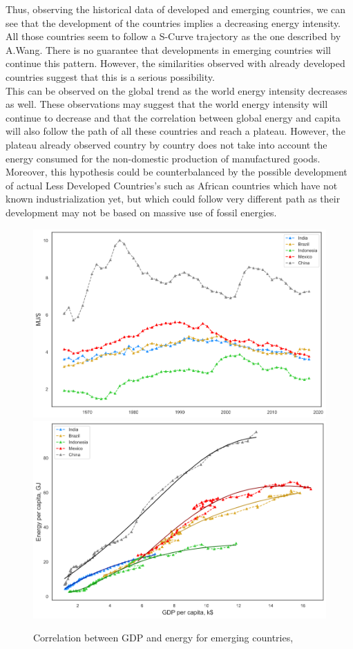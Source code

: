 \documentclass[conference]{IEEEtran}
\begin{document}
Thus, observing the historical data of developed and emerging countries, we can see that the development of the countries implies a decreasing energy intensity. All those countries seem to follow a S-Curve trajectory as the one described by A.Wang. There is no guarantee that developments in emerging countries will continue this pattern. However, the similarities observed with already developed countries suggest that this is a serious possibility. 
\\
This can be observed on the global trend as the world energy intensity decreases as well. These observations may suggest that the world energy intensity will continue to decrease and that the correlation between global energy and capita will also follow the path of all these countries and reach a plateau. However, the plateau already observed country by country does not take into account the energy consumed for the non-domestic production of manufactured goods. 
Moreover, this hypothesis could be counterbalanced by the possible development of actual Less Developed Countries’s such as African countries which have not known industrialization yet, but which could follow very different path as their development may not be based on massive use of fossil energies. 
\begin{figure}
    \centering
    \includegraphics[scale=0.225]{energy-intensity-emerging.png}
    \includegraphics[scale=0.225]{s-curve-emerging.png}
    \caption{Correlation between GDP and energy for emerging countries, \cite{bolt_maddison_2020} \cite{noauthor_statistical_nodate} }
    \label{fig:my_label}
\end{figure}
\end{document}
